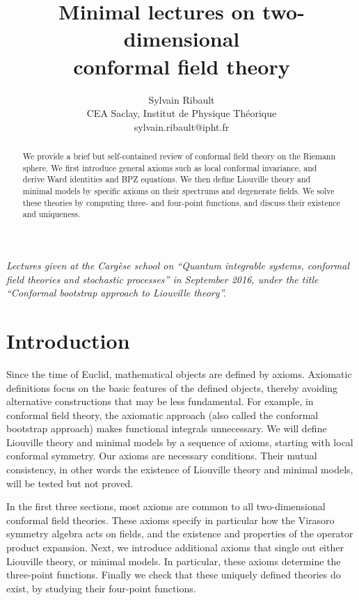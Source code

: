 \documentclass[12pt, a4paper]{article}
\title{\bfseries Minimal lectures on two-dimensional \\ conformal field theory}
\author{Sylvain Ribault \vspace{2mm}
\\
{\normalsize CEA Saclay, Institut de Physique Th\'eorique}
 \\
 {\footnotesize \ttfamily sylvain.ribault@ipht.fr }
}
\theoremstyle{break}
\begin{document}
\maketitle


\begin{abstract}
We provide a brief but self-contained review of conformal field theory on the Riemann sphere. We first introduce general axioms such as local conformal invariance, and derive Ward identities and BPZ equations. We then define Liouville theory and minimal models by specific axioms on their spectrums and degenerate fields. We solve these theories by computing 
three- and four-point functions, and discuss their existence and uniqueness. 
\end{abstract}

\vspace{5mm}

 \noindent\textit{Lectures given at the Carg\`ese school on ``Quantum integrable systems, conformal field theories and stochastic processes'' in September 2016, under the title ``Conformal bootstrap approach to Liouville theory''.}



\clearpage

\tableofcontents

\hypersetup{linkcolor=blue}

\setcounter{section}{-1}

\section{Introduction}

Since the time of Euclid, mathematical objects are defined by axioms. 
Axiomatic definitions focus on the basic features of the defined objects, thereby avoiding alternative constructions that may be less fundamental.
For example, in conformal field theory, the axiomatic approach (also called the conformal bootstrap approach) makes functional integrals unnecessary.
We will define Liouville theory and minimal models by a sequence of axioms, starting with local conformal symmetry. 
Our axioms are necessary conditions. 
Their mutual consistency, in other words the existence of Liouville theory and minimal models, will be tested but not proved.

In the first three sections, most axioms are common to all two-dimensional conformal field theories.
These axioms specify in particular how the Virasoro symmetry algebra acts on fields, and the existence and properties of the operator product expansion. 
Next, we introduce additional axioms that single out either Liouville theory, or minimal models.
In particular, these axioms determine the three-point functions. 
Finally we check that these uniquely defined theories do exist, by studying their four-point functions.
\end{document}
